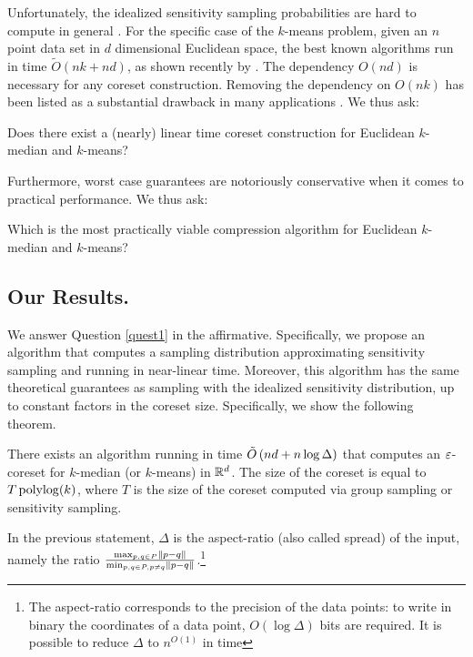 Unfortunately, the idealized sensitivity sampling probabilities are hard to compute in general \cite{DrineasMM06}. 
For the specific case of the $k$-means problem, given an $n$ point data set in $d$ dimensional Euclidean space, the best known algorithms run in time $\tilde{O}(nk+nd)$, as shown recently by \cite{DSWY22}. The dependency $O(nd)$ is necessary for any coreset construction. Removing the dependency on $O(nk)$ has been listed as a substantial drawback in many applications \cite{Feldman20}. We thus ask:


\begin{question}
\label{quest1}
Does there exist a (nearly) linear time coreset construction for Euclidean $k$-median and $k$-means?
\end{question}

Furthermore, worst case guarantees are notoriously conservative when it comes to practical performance. We thus ask:
\begin{question}
\label{quest2}
Which is the most practically viable compression algorithm for Euclidean $k$-median and $k$-means?
\end{question}

\subsection{Our Results.}

We answer Question \ref{quest1} in the affirmative. Specifically, we propose an algorithm that computes a sampling distribution approximating sensitivity sampling and running in near-linear time. Moreover, this algorithm has the same theoretical
guarantees as sampling with the idealized sensitivity distribution, up to constant factors in the coreset size. 
Specifically, we show the following theorem.


\begin{theorem}\label{thm:main}
There exists an algorithm running in time $\tilde O\left( nd + n \log \Delta\right)$  that computes an $\varepsilon$-coreset for $k$-median (or $k$-means) in $\mathbb{R}^d$. The size of the coreset is equal to $T \operatorname{polylog}(k)$, where $T$ is the size of the coreset computed via group sampling or sensitivity sampling.
\end{theorem}
In the previous statement, $\Delta$ is the aspect-ratio (also called spread) of the input, namely the ratio $\frac{\max_{p, q \in P} \left\| p-q\right\|}{\min_{p, q \in P, p \neq q} \left\| p-q\right\|}$.\footnote{The aspect-ratio corresponds to the precision of the data points: to write in binary the coordinates of a data point, $O(\log \Delta)$ bits are required. It is possible to reduce $\Delta$ to $n^{O(1)}$ in time }

